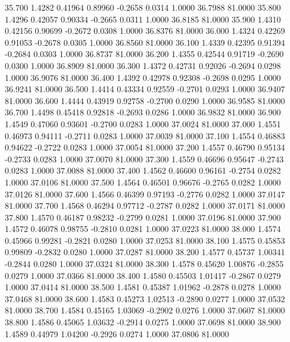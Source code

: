   35.700   1.4282   0.41964   0.89960  -0.2658   0.0314   1.0000  36.7988  81.0000
  35.800   1.4296   0.42057   0.90334  -0.2665   0.0311   1.0000  36.8185  81.0000
  35.900   1.4310   0.42156   0.90699  -0.2672   0.0308   1.0000  36.8376  81.0000
  36.000   1.4324   0.42269   0.91053  -0.2678   0.0305   1.0000  36.8560  81.0000
  36.100   1.4339   0.42395   0.91394  -0.2684   0.0303   1.0000  36.8737  81.0000
  36.200   1.4355   0.42544   0.91719  -0.2690   0.0300   1.0000  36.8909  81.0000
  36.300   1.4372   0.42731   0.92026  -0.2694   0.0298   1.0000  36.9076  81.0000
  36.400   1.4392   0.42978   0.92308  -0.2698   0.0295   1.0000  36.9241  81.0000
  36.500   1.4414   0.43334   0.92559  -0.2701   0.0293   1.0000  36.9407  81.0000
  36.600   1.4444   0.43919   0.92758  -0.2700   0.0290   1.0000  36.9585  81.0000
  36.700   1.4498   0.45418   0.92818  -0.2693   0.0286   1.0000  36.9832  81.0000
  36.900   1.4549   0.47060   0.93601  -0.2700   0.0283   1.0000  37.0024  81.0000
  37.000   1.4551   0.46973   0.94111  -0.2711   0.0283   1.0000  37.0039  81.0000
  37.100   1.4554   0.46883   0.94622  -0.2722   0.0283   1.0000  37.0054  81.0000
  37.200   1.4557   0.46790   0.95134  -0.2733   0.0283   1.0000  37.0070  81.0000
  37.300   1.4559   0.46696   0.95647  -0.2743   0.0283   1.0000  37.0088  81.0000
  37.400   1.4562   0.46600   0.96161  -0.2754   0.0282   1.0000  37.0106  81.0000
  37.500   1.4564   0.46501   0.96676  -0.2765   0.0282   1.0000  37.0126  81.0000
  37.600   1.4566   0.46399   0.97193  -0.2776   0.0282   1.0000  37.0147  81.0000
  37.700   1.4568   0.46294   0.97712  -0.2787   0.0282   1.0000  37.0171  81.0000
  37.800   1.4570   0.46187   0.98232  -0.2799   0.0281   1.0000  37.0196  81.0000
  37.900   1.4572   0.46078   0.98755  -0.2810   0.0281   1.0000  37.0223  81.0000
  38.000   1.4574   0.45966   0.99281  -0.2821   0.0280   1.0000  37.0253  81.0000
  38.100   1.4575   0.45853   0.99809  -0.2832   0.0280   1.0000  37.0287  81.0000
  38.200   1.4577   0.45737   1.00341  -0.2844   0.0280   1.0000  37.0324  81.0000
  38.300   1.4578   0.45620   1.00876  -0.2855   0.0279   1.0000  37.0366  81.0000
  38.400   1.4580   0.45503   1.01417  -0.2867   0.0279   1.0000  37.0414  81.0000
  38.500   1.4581   0.45387   1.01962  -0.2878   0.0278   1.0000  37.0468  81.0000
  38.600   1.4583   0.45273   1.02513  -0.2890   0.0277   1.0000  37.0532  81.0000
  38.700   1.4584   0.45165   1.03069  -0.2902   0.0276   1.0000  37.0607  81.0000
  38.800   1.4586   0.45065   1.03632  -0.2914   0.0275   1.0000  37.0698  81.0000
  38.900   1.4589   0.44979   1.04200  -0.2926   0.0274   1.0000  37.0806  81.0000
